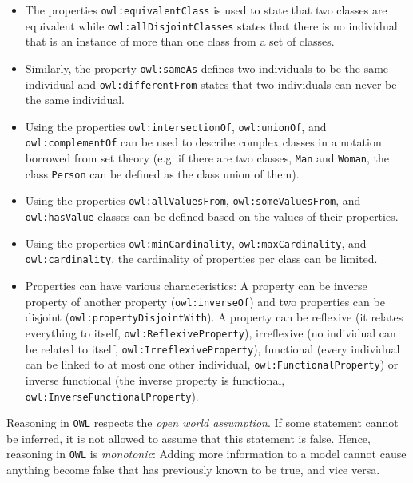 \begin{itemize}
  \item The properties \texttt{owl:equivalentClass} is used to state that two classes are equivalent while \texttt{owl:allDisjointClasses} states that there is no individual that is an instance of more than one class from a set of classes.
  \item Similarly, the property \texttt{owl:sameAs} defines two individuals to be the same individual and \texttt{owl:differentFrom} states that two individuals can never be the same individual.
  \item Using the properties \texttt{owl:intersectionOf}, \texttt{owl:unionOf}, and \texttt{owl:complementOf} can be used to describe complex classes in a notation borrowed from set theory (e.g. if there are two classes, \texttt{Man} and \texttt{Woman}, the class \texttt{Person} can be defined as the class union of them).
  \item Using the properties \texttt{owl:allValuesFrom}, \texttt{owl:someValuesFrom}, and \texttt{owl:hasValue} classes can be defined based on the values of their properties.
  \item Using the properties \texttt{owl:minCardinality}, \texttt{owl:maxCardinality}, and \texttt{owl:cardinality}, the cardinality of properties per class can be limited.
  \item Properties can have various characteristics: A property can be inverse property of another property (\texttt{owl:inverseOf}) and two properties can be disjoint (\texttt{owl:propertyDisjointWith}). A property can be reflexive (it relates everything to itself, \texttt{owl:ReflexiveProperty}), irreflexive (no individual can be related to itself, \texttt{owl:IrreflexiveProperty}), functional (every individual can be linked to at most one other individual, \texttt{owl:FunctionalProperty}) or inverse functional (the inverse property is functional, \texttt{owl:InverseFunctionalProperty}).
\end{itemize}

Reasoning in \texttt{OWL} respects the \emph{open world assumption}. If some statement cannot be inferred, it is not allowed to assume that this statement is false. Hence, reasoning in \texttt{OWL} is \emph{monotonic}: Adding more information to a model cannot cause anything become false that has previously known to be true, and vice versa.

